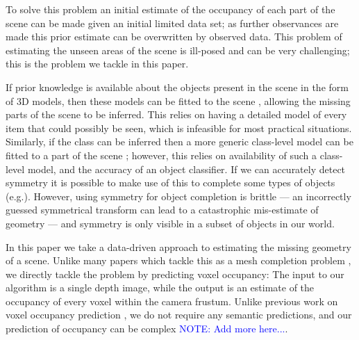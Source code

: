 \documentclass[10pt,twocolumn,letterpaper]{article}
\makeatletter
\renewcommand*{\eg}{e.g.\@\xspace}
\newcommand{\note}[1]{\textcolor{blue}{NOTE: #1}}
\makeatother
\begin{document}
To solve this problem an initial estimate of the occupancy of each part of the scene can be made given an initial limited data set; as further observances are made this prior estimate can be overwritten by observed data.
This problem of estimating the unseen areas of the scene is ill-posed and can be very challenging; this is the problem we tackle in this paper.

If prior knowledge is available about the objects present in the scene in the form of 3D models, then these models can be fitted to the scene \cite{hinterstoisser-accv-2012, drost-3dimpvt-2012, rusu-iros-2010}, allowing the missing parts of the scene to be inferred.
This relies on having a detailed model of every item that could possibly be seen, which is infeasible for most practical situations.
Similarly, if the class can be inferred then a more generic class-level model can be fitted to a part of the scene \cite{cocias-cgvcv-2013, prisacariu-iccv-2011}; however, this relies on availability of such a class-level model, and the accuracy of an object classifier.
If we can accurately detect symmetry it is possible to make use of this to complete some types of objects (\eg \cite{law-cviu-2010, thrun-iccv-2005, kroemer-humanoids-2012}). 
However, using symmetry for object completion is brittle --- an incorrectly guessed symmetrical transform can lead to a catastrophic mis-estimate of geometry --- and symmetry is only visible in a subset of objects in our world.




In this paper we take a data-driven approach to estimating the missing geometry of a scene.
Unlike many papers which tackle this as a mesh completion problem \cite{schnabel-eurographics-2009, ju-cst-2009, maybsilberman-eccv-2014}, we directly tackle the problem by predicting voxel occupancy:
The input to our algorithm is a single depth image, while the output is an estimate of the occupancy of every voxel within the camera frustum.
Unlike previous work on voxel occupancy prediction \cite{kim-iccv-2013}, we do not require any semantic predictions, and our prediction of occupancy can be complex \note{Add more here...}.
\end{document}
